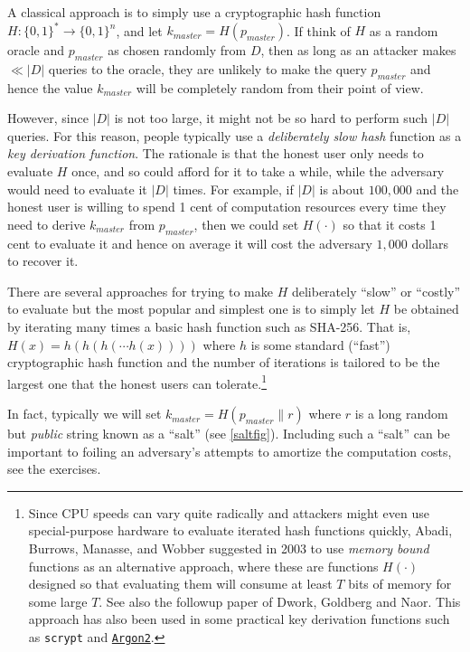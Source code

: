 A classical approach is to simply use a cryptographic hash function
\(H:\{0,1\}^*\rightarrow\{0,1\}^n\), and let
\(k_{master} = H(p_{master})\). If think of \(H\) as a random oracle and
\(p_{master}\) as chosen randomly from \(D\), then as long as an
attacker makes \(\ll |D|\) queries to the oracle, they are unlikely to
make the query \(p_{master}\) and hence the value \(k_{master}\) will be
completely random from their point of view.

However, since \(|D|\) is not too large, it might not be so hard to
perform such \(|D|\) queries. For this reason, people typically use a
\emph{deliberately slow hash} function as a \emph{key derivation
function}. The rationale is that the honest user only needs to evaluate
\(H\) once, and so could afford for it to take a while, while the
adversary would need to evaluate it \(|D|\) times. For example, if
\(|D|\) is about \(100,000\) and the honest user is willing to spend 1
cent of computation resources every time they need to derive
\(k_{master}\) from \(p_{master}\), then we could set \(H(\cdot)\) so
that it costs 1 cent to evaluate it and hence on average it will cost
the adversary \(1,000\) dollars to recover it.

There are several approaches for trying to make \(H\) deliberately
``slow'' or ``costly'' to evaluate but the most popular and simplest one
is to simply let \(H\) be obtained by iterating many times a basic hash
function such as SHA-256. That is, \(H(x)=h(h(h(\cdots h(x))))\) where
\(h\) is some standard (``fast'') cryptographic hash function and the
number of iterations is tailored to be the largest one that the honest
users can tolerate.\footnote{Since CPU speeds can vary quite radically
  and attackers might even use special-purpose hardware to evaluate
  iterated hash functions quickly, Abadi, Burrows, Manasse, and Wobber
  suggested in 2003 to use \emph{memory bound} functions as an
  alternative approach, where these are functions \(H(\cdot)\) designed
  so that evaluating them will consume at least \(T\) bits of memory for
  some large \(T\). See also the followup paper of Dwork, Goldberg and
  Naor. This approach has also been used in some practical key
  derivation functions such as \texttt{scrypt} and
  \href{https://password-hashing.net/argon2-specs.pdf}{\texttt{Argon2}}.}

In fact, typically we will set \(k_{master} = H(p_{master}\| r)\) where
\(r\) is a long random but \emph{public} string known as a ``salt'' (see
\cref{saltfig}). Including such a ``salt'' can be important to foiling
an adversary's attempts to amortize the computation costs, see the
exercises.


